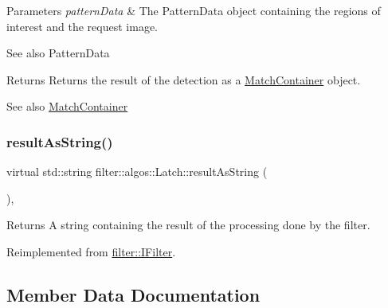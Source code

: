 \begin{DoxyParams}{Parameters}
{\em pattern\+Data} & The Pattern\+Data object containing the regions of interest and the request image. \\
\hline
\end{DoxyParams}
\begin{DoxySeeAlso}{See also}
Pattern\+Data 
\end{DoxySeeAlso}
\begin{DoxyReturn}{Returns}
Returns the result of the detection as a \hyperlink{classfilter_1_1algos_1_1_latch_1_1_match_container}{Match\+Container} object. 
\end{DoxyReturn}
\begin{DoxySeeAlso}{See also}
\hyperlink{classfilter_1_1algos_1_1_latch_1_1_match_container}{Match\+Container} 
\end{DoxySeeAlso}
\mbox{\label{classfilter_1_1algos_1_1_latch_a24c57b8d90c89b1f95fe2f7624a9d033}} 
\subsubsection{\texorpdfstring{result\+As\+String()}{resultAsString()}}
{\footnotesize\ttfamily virtual std\+::string filter\+::algos\+::\+Latch\+::result\+As\+String (\begin{DoxyParamCaption}{ }\end{DoxyParamCaption})\hspace{0.3cm}{\ttfamily [inline]}, {\ttfamily [virtual]}}

\begin{DoxyReturn}{Returns}
A string containing the result of the processing done by the filter. 
\end{DoxyReturn}


Reimplemented from \hyperlink{classfilter_1_1_i_filter_ab99902b060a6d9edc3452a8c9f85e37e}{filter\+::\+I\+Filter}.



\subsection{Member Data Documentation}
\mbox{\label{classfilter_1_1algos_1_1_latch_a58701ffe3dbd2285af28c15fab09cf85}} 
